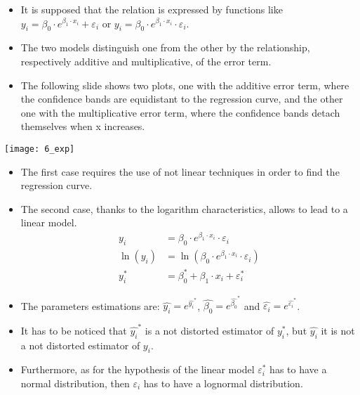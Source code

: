 \begin{frame}
  \vspace{0.25cm}
  \begin{itemize}
    \item It is supposed that the relation is expressed by functions like $ y_i = \beta_0 \cdot e^{\beta_1 \cdot x_i} + \varepsilon_i $ or $ y_i = \beta_0 \cdot e^{\beta_1 \cdot x_i} \cdot \varepsilon_i $.
    \vspace{0.25cm}
    \item The two models distinguish one from the other by the relationship, respectively additive and multiplicative, of the error term.
    \vspace{0.25cm}
    \item The following slide shows two plots, one with the additive error term, where the confidence bands are equidistant to the regression curve, and the other one with the multiplicative error term, where the confidence bands detach themselves when x increases.
  \end{itemize}
\end{frame}

\begin{frame}
  \begin{center}
    \texttt{[image: 6\_exp]}
  \end{center}
\end{frame}

\begin{frame}
  \begin{itemize}
    \item The first case requires the use of not linear techniques in order to find the regression curve.
    \item The second case, thanks to the logarithm characteristics, allows to lead to a linear model.
    \vspace{-0.5cm}
    \begin{displaymath}
      \begin{split}
        y_i &= \beta_0 \cdot e^{\beta_1 \cdot x_i} \cdot \varepsilon_i \\
        \ln(y_i) &= \ln(\beta_0 \cdot e^{\beta_1 \cdot x_i} \cdot \varepsilon_i) \\
        y_i^* &= \beta_0^* + \beta_1 \cdot x_i + \varepsilon_i^*
      \end{split}
    \end{displaymath}
    \item The parameters estimations are: $ \hat{y_i} = e^{\hat{y_i}^*} $, $ \hat{\beta_0} = e^{\hat{\beta_0}^*} $ and $ \hat{\varepsilon_i} = e^{\hat{\varepsilon_i}^*} $.
    \item It has to be noticed that $ \hat{y_i}^* $ is a not distorted estimator of $ y_i^* $, but $ \hat{y_i} $ it is not a not distorted estimator of $ y_i $.
    \item Furthermore, as for the hypothesis of the linear model $ \varepsilon_i^* $ has to have a normal distribution, then $ \varepsilon_i $ has to have a lognormal distribution.
  \end{itemize}
\end{frame}

